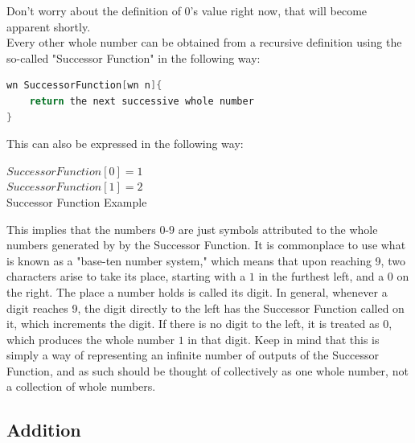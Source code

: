 Don't worry about the definition of $0$'s value right now, that will become apparent shortly. \\
Every other whole number can be obtained from a recursive definition using the so-called "Successor Function" in the following way:
\begin{center}
\begin{lstlisting}[language=C, caption=Successor Function,label=lst:sucFunc]
wn SuccessorFunction[wn n]{
	return the next successive whole number
}
\end{lstlisting}
\end{center} 
This can also be expressed in the following way:
\begin{center}
$SuccessorFunction[0] = 1$\\
$SuccessorFunction[1] = 2$\\
Successor Function Example\label{eq:sucFuncEx}
\end{center}
This implies that the numbers $0$-$9$ are just symbols attributed to the whole numbers generated by by the Successor Function. It is commonplace to use what is known as a "base-ten number system," which means that upon reaching 9, two characters arise to take its place, starting with a $1$ in the furthest left, and a $0$ on the right. The place a number holds is called its digit. In general, whenever a digit reaches 9, the digit directly to the left has the Successor Function called on it, which increments the digit. If there is no digit to the left, it is treated as $0$, which produces the whole number $1$ in that digit. Keep in mind that this is simply a way of representing an infinite number of outputs of the Successor Function, and as such should be thought of collectively as one whole number, not a collection of whole numbers. \\


\subsection{Addition}

